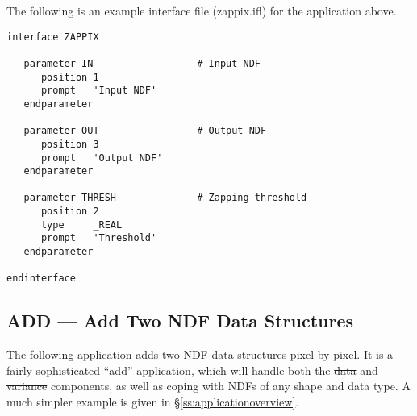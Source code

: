 The following is an example  interface file
(zappix.ifl) for the application above. 

\small
\begin{verbatim}
interface ZAPPIX

   parameter IN                  # Input NDF
      position 1
      prompt   'Input NDF'
   endparameter

   parameter OUT                 # Output NDF
      position 3
      prompt   'Output NDF'
   endparameter

   parameter THRESH              # Zapping threshold
      position 2
      type     _REAL
      prompt   'Threshold'
   endparameter

endinterface
\end{verbatim}
\normalsize


\newpage
\subsection{\label{ss:addexample}ADD --- Add Two NDF Data Structures}

The following application adds two NDF data structures pixel-by-pixel. It is a
fairly sophisticated ``add'' application, which will handle both the
\st{data\/} and \st{variance\/} components, as well as coping with
NDFs of any 
shape and data type.  A much simpler example is given in
\S\ref{ss:applicationoverview}.

